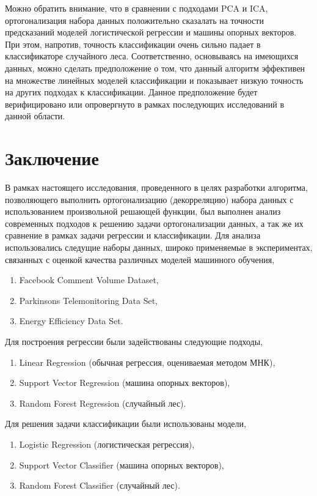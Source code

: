\documentclass[runningheads]{llncs}
\begin{document}
Можно обратить внимание, что в сравнении с подходами PCA и ICA, ортогонализация набора данных положительно сказалать на точности предсказаний моделей логистической регрессии и машины опорных векторов. При этом, напротив, точность классификации очень сильно падает в классификаторе случайного леса. Соответственно, основываясь на имеющихся данных, можно сделать предположение о том, что данный алгоритм эффективен на множестве линейных моделей классификации и показывает низкую точность на других подходах к классификации. Данное предположение будет верифицировано или опровергнуто в рамках последующих исследований в данной области.

\section*{Заключение}
\hspace{0.4cm}
В рамках настоящего исследования, проведенного в целях разработки алгоритма, позволяющего выполнить ортогонализацию (декорреляцию) набора данных с использованием произвольной решающей функции, был выполнен анализ современных подходов к решению задачи ортогонализации данных, а так же их сравнение в рамках задачи регрессии и классификации. Для анализа использовались следущие наборы данных, широко применяемые в экспериментах, связанных с оценкой качества различных моделей машинного обучения,
\begin{enumerate}
  \item Facebook Comment Volume Dataset, 
  \item Parkinsons Telemonitoring Data Set,
  \item Energy Efficiency Data Set.
\end{enumerate}
Для построения регрессии были задействованы следующие подходы,
\begin{enumerate}
  \item Linear Regression (обычная регрессия, оцениваемая методом МНК), 
  \item Support Vector Regression (машина опорных векторов),
  \item Random Forest Regression (случайный лес).
\end{enumerate}
Для решения задачи классификации были использованы модели,
\begin{enumerate}
  \item Logistic Regression (логистическая регрессия), 
  \item Support Vector Classifier (машина опорных векторов),
  \item Random Forest Classifier (случайный лес).
\end{enumerate}
\end{document}
